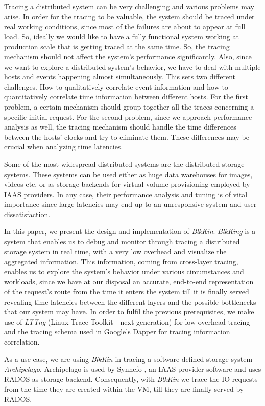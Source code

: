 \documentclass[a4paper,10pt,twocolumn]{article}
\begin{document}
Tracing a distributed system can be very challenging and various problems may
arise. In order for the tracing to be valuable, the system should be traced
under real working conditions, since most of the failures are about to appear at
full load. So, ideally we would like to have a fully functional system working
at production scale that is getting traced at the same time. So, the tracing
mechanism should not affect the system's performance significantly. Also, since
we want to explore a distributed system's behavior, we have to deal with
multiple hosts and events happening almost simultaneously. This sets two
different challenges. How to qualitatively correlate event information and how
to quantitatively correlate time information between different hosts. For the
first problem, a certain mechanism should group together all the traces
concerning a specific initial request. For the second problem, since we approach
performance analysis as well, the tracing mechanism should handle the time
differences between the hosts' clocks and try to eliminate them. These
differences may be crucial when analyzing time latencies.

Some of the most widespread distributed systems are the distributed storage
systems. These systems can be used either as huge data warehouses for images,
videos etc, or as storage backends for virtual volume provisioning employed by
IAAS providers. In any case, their performance analysis and tuning is of vital
importance since large latencies may end up to an unresponsive system and user
dissatisfaction.

In this paper, we present the design and implementation of \emph{BlkKin}.
\emph{BlkKing} is a system that enables us to debug and monitor through tracing
a distributed storage system in real time, with a very low overhead and
visualize the aggregated information. This information, coming from cross-layer
tracing, enables us to explore the system's behavior under various circumstances
and workloads, since we have at our disposal an accurate, end-to-end
representation of the request's route from the time it enters the system till it
is finally served revealing time latencies between the different layers and the
possible bottlenecks that our system may have. In order to fulfil the previous
prerequisites, we make use of \emph{LTTng} (Linux Trace Toolkit - next
generation)\cite{lttng} for low overhead tracing and the tracing schema used in
Google's Dapper for tracing information correlation.

As a use-case, we are using \emph{BlkKin} in tracing a software defined storage
system \emph{Archipelago}\cite{archip}. Archipelago is used by Synnefo
\cite{synnefo}, an IAAS provider software and uses RADOS\cite{rados} as storage
backend. Consequently, with \emph{BlkKin} we trace the IO requests from the time
they are created within the VM, till they are finally served by RADOS.
\end{document}
